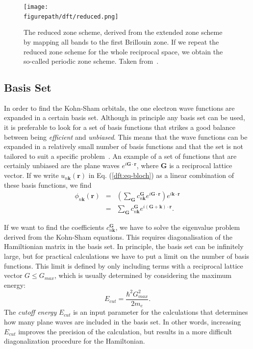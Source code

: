 \begin{refsection}
\begin{figure}[ht] 
\captionsetup{width=0.8\textwidth} 
\centering 
\texttt{[image: \\figurepath/dft/reduced.png]} 
\caption{\label{dft:fig-reduced}The reduced zone scheme, derived from the extended 
zone scheme by mapping all bands to the first Brillouin zone. If we repeat the 
reduced zone scheme for the whole reciprocal space, we obtain the so-called 
periodic zone scheme. Taken from~\cite{Kittel2004}.} 
\end{figure} 
 
\subsection{Basis Set} \label{dft:sec-basis_set} 
 
In order to find the Kohn-Sham orbitals, the one electron wave functions are 
expanded in a certain basis set. Although in principle any basis set can be 
used, it is preferable to look for a set of basis functions that strikes a good balance between being  
\textit{efficient} and \textit{unbiased}. This means that the wave functions 
can be expanded in a relatively small number of basis functions and that the 
set is not tailored to suit a specific problem~\cite{Cottenier2013}. An 
example of a set of functions that are certainly unbiased are the plane waves $e^{i \mathbf{G}\cdot 
\mathbf{r}}$, where $\mathbf{G}$ is a reciprocal lattice vector. If we write 
$u_{n\mathbf{k}}(\mathbf{r})$ in Eq. (\ref{dft:eq-bloch}) as a linear combination of 
these basis functions, we find 
\begin{eqnarray} 
\phi_{n\mathbf{k}}(\mathbf{r}) &=& \left( \sum_{\mathbf{G}} 
c_{n\mathbf{k}}^{\mathbf{G}}e^{i\mathbf{G}\cdot \mathbf{r}} \right) 
e^{i\mathbf{k}\cdot \mathbf{r}} 
\\ \label{dft:eq-planewaves} &=& \sum_{\mathbf{G}} 
c_{n\mathbf{k}}^{\mathbf{G}}e^{i(\mathbf{G}+\mathbf{k})\cdot \mathbf{r}}. 
\end{eqnarray} 
 
If we want to find the coefficients $c_{n\mathbf{k}}^{\mathbf{G}}$, we have to 
solve the eigenvalue problem derived from the Kohn-Sham equations. This 
requires diagonalisation of the Hamiltionian matrix in the basis set. In 
principle, the basis set can be infinitely large, but for practical 
calculations we have to put a limit on the number of basis functions. This 
limit is defined by only including terms with a reciprocal lattice vector $G 
\leq G_{max}$, which is usually determined by considering the maximum energy: 
\begin{equation} \label{dft:eq-energy_cutoff}
E_{cut} = \frac{\hbar^2 G_{max}^2}{2m_e}. 
\end{equation} 
The \textit{cutoff energy} $E_{cut}$ is an input parameter for the 
calculations that determines how many plane waves are included in the basis 
set. In other words, increasing $E_{cut}$ improves the precision of the 
calculation, but results in a more difficult diagonalization procedure for the 
Hamiltonian.  


\end{refsection}
